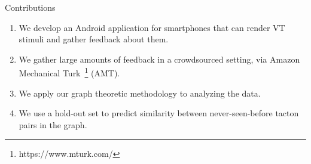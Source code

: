 

\begin{frame}{Contributions}
        
    \begin{enumerate}
        \item We develop an Android application for smartphones that can render VT stimuli and gather feedback about them.
        \item We gather large amounts of feedback in a crowdsourced setting, via Amazon Mechanical Turk~\footnote{https://www.mturk.com/} (AMT).
        \item We apply our graph theoretic methodology to analyzing the data.
        \item We use a hold-out set to predict similarity between never-seen-before tacton pairs in the graph.
    \end{enumerate}
    
\end{frame}